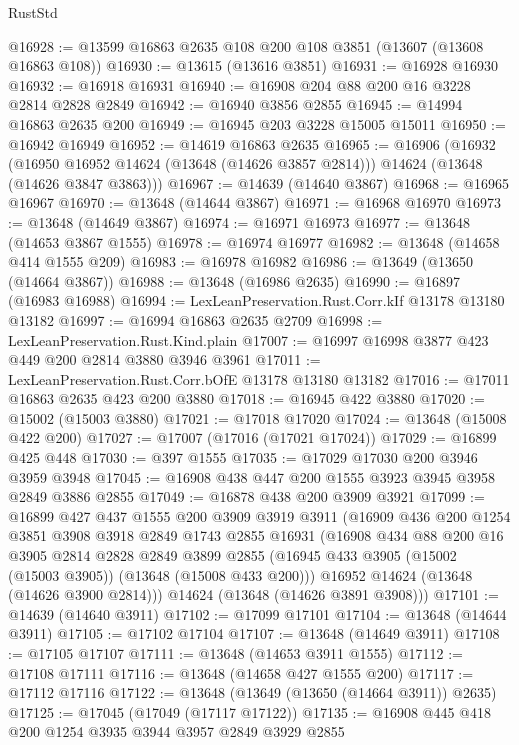 \begin{lexlean}{RustStd}
\begin{coremodule}
@16928 := @13599 @16863 @2635 @108 @200 @108 @3851 (@13607 (@13608 @16863 @108))
@16930 := @13615 (@13616 @3851)
@16931 := @16928 @16930
@16932 := @16918 @16931
@16940 := @16908 @204 @88 @200 @16 @3228 @2814 @2828 @2849
@16942 := @16940 @3856 @2855
@16945 := @14994 @16863 @2635 @200
@16949 := @16945 @203 @3228 @15005 @15011
@16950 := @16942 @16949
@16952 := @14619 @16863 @2635
@16965 := @16906
    (@16932
      (@16950 @16952 @14624 (@13648 (@14626 @3857 @2814)))
      @14624
      (@13648 (@14626 @3847 @3863)))
@16967 := @14639 (@14640 @3867)
@16968 := @16965 @16967
@16970 := @13648 (@14644 @3867)
@16971 := @16968 @16970
@16973 := @13648 (@14649 @3867)
@16974 := @16971 @16973
@16977 := @13648 (@14653 @3867 @1555)
@16978 := @16974 @16977
@16982 := @13648 (@14658 @414 @1555 @209)
@16983 := @16978 @16982
@16986 := @13649 (@13650 (@14664 @3867))
@16988 := @13648 (@16986 @2635)
@16990 := @16897 (@16983 @16988)
@16994 := LexLeanPreservation.Rust.Corr.kIf @13178 @13180 @13182
@16997 := @16994 @16863 @2635 @2709
@16998 := LexLeanPreservation.Rust.Kind.plain
@17007 := @16997 @16998 @3877 @423 @449 @200 @2814 @3880 @3946 @3961
@17011 := LexLeanPreservation.Rust.Corr.bOfE @13178 @13180 @13182
@17016 := @17011 @16863 @2635 @423 @200 @3880
@17018 := @16945 @422 @3880
@17020 := @15002 (@15003 @3880)
@17021 := @17018 @17020
@17024 := @13648 (@15008 @422 @200)
@17027 := @17007 (@17016 (@17021 @17024))
@17029 := @16899 @425 @448
@17030 := @397 @1555
@17035 := @17029 @17030 @200 @3946 @3959 @3948
@17045 := @16908 @438 @447 @200 @1555 @3923 @3945 @3958 @2849 @3886 @2855
@17049 := @16878 @438 @200 @3909 @3921
@17099 := @16899
    @427
    @437
    @1555
    @200
    @3909
    @3919
    @3911
    (@16909
      @436
      @200
      @1254
      @3851
      @3908
      @3918
      @2849
      @1743
      @2855
      @16931
      (@16908
        @434
        @88
        @200
        @16
        @3905
        @2814
        @2828
        @2849
        @3899
        @2855
        (@16945 @433 @3905 (@15002 (@15003 @3905)) (@13648 (@15008 @433 @200)))
        @16952
        @14624
        (@13648 (@14626 @3900 @2814)))
      @14624
      (@13648 (@14626 @3891 @3908)))
@17101 := @14639 (@14640 @3911)
@17102 := @17099 @17101
@17104 := @13648 (@14644 @3911)
@17105 := @17102 @17104
@17107 := @13648 (@14649 @3911)
@17108 := @17105 @17107
@17111 := @13648 (@14653 @3911 @1555)
@17112 := @17108 @17111
@17116 := @13648 (@14658 @427 @1555 @200)
@17117 := @17112 @17116
@17122 := @13648 (@13649 (@13650 (@14664 @3911)) @2635)
@17125 := @17045 (@17049 (@17117 @17122))
@17135 := @16908 @445 @418 @200 @1254 @3935 @3944 @3957 @2849 @3929 @2855

\end{coremodule}
\end{lexlean}
